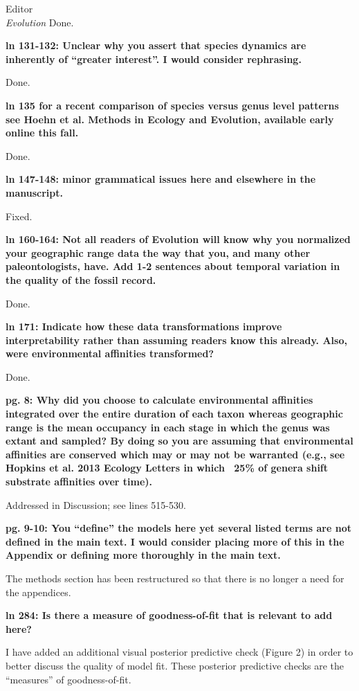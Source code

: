 \documentclass{letter}
\begin{document}
\begin{letter}{Editor \\ \textit{Evolution}}
  Done.

  \textbf{ln 131-132: Unclear why you assert that species dynamics are inherently of “greater interest”. I would consider rephrasing.}

  Done.

  \textbf{ln 135 for a recent comparison of species versus genus level patterns see Hoehn et al. Methods in Ecology and Evolution, available early online this fall.}

  Done.

  \textbf{ln 147-148: minor grammatical issues here and elsewhere in the manuscript.}

  Fixed.

  \textbf{ln 160-164: Not all readers of Evolution will know why you normalized your geographic range data the way that you, and many other paleontologists, have. Add 1-2 sentences about temporal variation in the quality of the fossil record.}

  Done.

  \textbf{ln 171: Indicate how these data transformations improve interpretability rather than assuming readers know this already. Also, were environmental affinities transformed?}

  Done.

  \textbf{pg. 8: Why did you choose to calculate environmental affinities integrated over the entire duration of each taxon whereas geographic range is the mean occupancy in each stage in which the genus was extant and sampled? By doing so you are assuming that environmental affinities are conserved which may or may not be warranted (e.g., see Hopkins et al. 2013 Ecology Letters in which ~25\% of genera shift substrate affinities over time).}

  Addressed in Discussion; see lines 515-530. %

  \textbf{pg. 9-10: You “define” the models here yet several listed terms are not defined in the main text. I would consider placing more of this in the Appendix or defining more thoroughly in the main text.}

  The methods section has been restructured so that there is no longer a need for the appendices.

  \textbf{ln 284: Is there a measure of goodness-of-fit that is relevant to add here?}

  I have added an additional visual posterior predictive check (Figure 2) in order to better discuss the quality of model fit. These posterior predictive checks are the ``measures'' of goodness-of-fit.


\end{letter}
\end{document}
